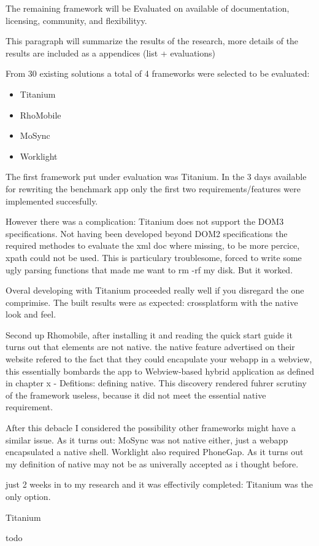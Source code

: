 The remaining framework will be Evaluated on available of documentation, licensing, community, and flexibilityy.


This paragraph will summarize the results of the research, more details of the results are included as a appendices (list + evaluations) %

From 30 existing solutions a total of 4 frameworks were selected to be evaluated:
\begin{itemize}
	\item Titanium
	\item RhoMobile
	\item MoSync
	\item Worklight
\end{itemize}

The first framework put under evaluation was Titanium. In the 3 days available for rewriting the benchmark app only the first two requirements/features were implemented succesfully.

However there was a complication: Titanium does not support the DOM3 specifications. Not having been developed beyond DOM2 specifications the required methodes to evaluate the xml doc where missing, to be more percice, xpath could not be used. This is particulary troublesome, forced to write some ugly parsing functions that made me want to rm -rf my disk. But it worked.

Overal developing with Titanium proceeded really well if you disregard the one comprimise. The built results were as expected: crossplatform with the native look and feel.


Second up Rhomobile, after installing it and reading the quick start guide it turns out that elements are not native. the native feature advertised on their website refered to the fact that they could encapulate your webapp in a webview, this essentially bombards the app to Webview-based hybrid application as defined in chapter x - Defitions: defining native. This discovery rendered fuhrer scrutiny of the framework useless, because it did not meet the essential native requirement.

After this debacle I considered the possibility other frameworks might have a similar issue. As it turns out: MoSync was not native either, just a webapp encapsulated a native shell. Worklight also required PhoneGap. As it turns out my definition of native may not be as univerally accepted as i thought before.

just 2 weeks in to my research and it was effectivily completed: Titanium was the only option.



Titanium 

todo